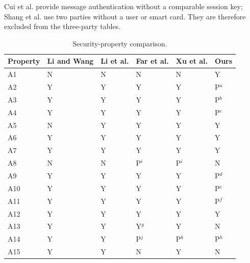 \documentclass[cmc,article,submit,moreauthors,pdftex]{Definitions/tsp}
\begin{document}
Cui et al. \cite{cui} provide message authentication without a comparable session key; Shang et al. \cite{shang} use two parties without a user or smart card. They are therefore excluded from the three-party tables.

\begin{table}[t]
\caption{Security-property comparison.}
\label{tab:security}
\begin{tabularx}{\textwidth}{lYYYYY}
\toprule
\textbf{Property} & \textbf{Li and Wang \cite{li2019twofactor}} & \textbf{Li et al. \cite{li2018ecc}} & \textbf{Far et al. \cite{far}} & \textbf{Xu et al. \cite{xu}} & \textbf{Ours}\\
\midrule
A1  & N & N & N & N & Y\\
A2  & Y & Y & Y & Y & P$^{a}$\\
A3  & Y & Y & Y & Y & P$^{b}$\\
A4  & Y & Y & Y & Y & P$^{c}$\\
A5  & N & Y & Y & Y & Y\\
A6  & Y & Y & Y & Y & Y\\
A7  & Y & Y & Y & Y & Y\\
A8  & N & N & P$^{i}$ & P$^{i}$ & N\\
A9  & Y & Y & Y & Y & P$^{d}$\\
A10 & Y & Y & Y & Y & P$^{e}$\\
A11 & Y & Y & Y & Y & P$^{f}$\\
A12 & Y & Y & Y & Y & Y\\
\midrule
A13 & Y & Y & Y$^{g}$ & Y & N\\
A14 & Y & Y & P$^{j}$ & P$^{k}$ & P$^{h}$\\
A15 & Y & Y & N & Y & N\\
\bottomrule
\end{tabularx}


\end{table}
\end{document}
